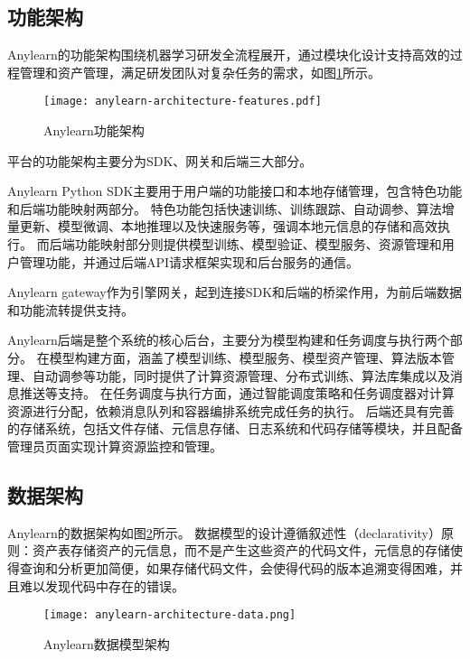 \subsection{功能架构}

Anylearn的功能架构围绕机器学习研发全流程展开，通过模块化设计支持高效的过程管理和资产管理，满足研发团队对复杂任务的需求，如图\ref{fig:anylearnfeatures}所示。

\begin{figure}
  \centering
  \texttt{[image: anylearn-architecture-features.pdf]}
  \caption{Anylearn功能架构}
  \label{fig:anylearnfeatures}
\end{figure}

平台的功能架构主要分为SDK、网关和后端三大部分。

Anylearn Python SDK主要用于用户端的功能接口和本地存储管理，包含特色功能和后端功能映射两部分。
特色功能包括快速训练、训练跟踪、自动调参、算法增量更新、模型微调、本地推理以及快速服务等，强调本地元信息的存储和高效执行。
而后端功能映射部分则提供模型训练、模型验证、模型服务、资源管理和用户管理功能，并通过后端API请求框架实现和后台服务的通信。

Anylearn gateway作为引擎网关，起到连接SDK和后端的桥梁作用，为前后端数据和功能流转提供支持。

Anylearn后端是整个系统的核心后台，主要分为模型构建和任务调度与执行两个部分。
在模型构建方面，涵盖了模型训练、模型服务、模型资产管理、算法版本管理、自动调参等功能，同时提供了计算资源管理、分布式训练、算法库集成以及消息推送等支持。
在任务调度与执行方面，通过智能调度策略和任务调度器对计算资源进行分配，依赖消息队列和容器编排系统完成任务的执行。
后端还具有完善的存储系统，包括文件存储、元信息存储、日志系统和代码存储等模块，并且配备管理员页面实现计算资源监控和管理。

\subsection{数据架构}

Anylearn的数据架构如图\ref{fig:anylearndata}所示。
数据模型的设计遵循叙述性（declarativity）原则\cite{Sch17}：资产表存储资产的元信息，而不是产生这些资产的代码文件，元信息的存储使得查询和分析更加简便，如果存储代码文件，会使得代码的版本追溯变得困难，并且难以发现代码中存在的错误。

\begin{figure}
  \centering
  \texttt{[image: anylearn-architecture-data.png]}
  \caption{Anylearn数据模型架构}
  \label{fig:anylearndata}
\end{figure}

